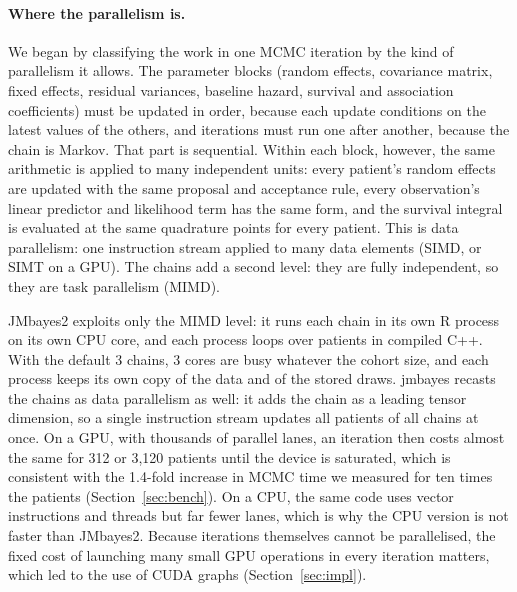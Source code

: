 \documentclass[11pt]{article}
\begin{document}
\paragraph{Where the parallelism is.} We began by classifying the work in one MCMC
iteration by the kind of parallelism it allows. The parameter blocks (random effects,
covariance matrix, fixed effects, residual variances, baseline hazard, survival and
association coefficients) must be updated in order, because each update conditions on the
latest values of the others, and iterations must run one after another, because the chain
is Markov. That part is sequential. Within each block, however, the same arithmetic is
applied to many independent units: every patient's random effects are updated with the
same proposal and acceptance rule, every observation's linear predictor and likelihood term
has the same form, and the survival integral is evaluated at the same quadrature points for
every patient. This is data parallelism: one instruction stream applied to many data
elements (SIMD, or SIMT on a GPU). The chains add a second level: they are fully
independent, so they are task parallelism (MIMD).

JMbayes2 exploits only the MIMD level: it runs each chain in its own R process on its own
CPU core, and each process loops over patients in compiled C++. With the default 3 chains,
3 cores are busy whatever the cohort size, and each process keeps its own copy of the data
and of the stored draws. jmbayes recasts the chains as data parallelism as well: it adds the
chain as a leading tensor dimension, so a single instruction stream updates all patients of
all chains at once. On a GPU, with thousands of parallel lanes, an iteration then costs
almost the same for 312 or 3,120 patients until the device is saturated, which is
consistent with the 1.4-fold increase in MCMC time we measured for ten times the patients
(Section~\ref{sec:bench}). On a CPU, the same code uses vector instructions and threads but
far fewer lanes, which is why the CPU version is not faster than JMbayes2. Because
iterations themselves cannot be parallelised, the fixed cost of launching many small GPU
operations in every iteration matters, which led to the use of CUDA graphs (Section~\ref{sec:impl}).
\end{document}
